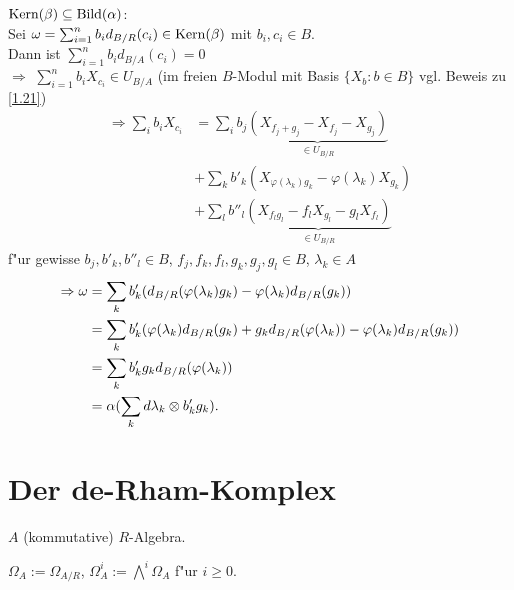 \documentclass[a4paper, 10pt]{report}
\begin{document}
\begin{Prop}
\begin{enumerate}
\begin{Bew}
\glqq$\mathrm{Kern}(\beta) \subseteq \mathrm{Bild}(\alpha)$\grqq:\\
Sei $\omega = \sum_{i=1}^n{b_i} d_{B/R}(c_i) \in \mathrm{Kern}(\beta)$ mit $b_i,c_i \in B$.\\
Dann ist $\sum_{i=1}^n{b_i d_{B/A}}(c_i) = 0$\\
$\Rightarrow$ $\sum_{i=1}^n{b_i X_{c_i}} \in U_{B/A}$ (im freien $B$-Modul mit Basis $\{ X_b : b \in B \}$ vgl. Beweis zu \ref{1.21})
\begin{align*}
\Rightarrow\sum_i b_i X_{c_i} &= \sum_i b_j \underbrace{(X_{f_j + g_j} - X_{f_j} - X_{g_j})}_{\in U_{B/R}} \\
&+ \sum_k b'_k (X_{\varphi(\lambda_k) g_k} - \varphi(\lambda_k) X_{g_k}) \\
&+ \sum_l b''_l \underbrace{(X_{f_l g_l} - f_l X_{g_l} - g_l X_{f_l})}_{\in
U_{B/R}}
\end{align*}
f"ur gewisse $b_j, b'_k, b''_l \in B$, $f_j,f_k,f_l,g_k,g_j,g_l \in B$,
$\lambda_k \in A$
\begin{align*}
\Rightarrow \omega &= \sum_k b'_k (d_{B/R}(\varphi(\lambda_k) g_k) - \varphi(\lambda_k) d_{B/R}(g_k)) \\
&= \sum_k b'_k (\varphi(\lambda_k) d_{B/R}(g_k) + g_k 
d_{B/R}(\varphi(\lambda_k)) - \varphi(\lambda_k) d_{B/R}(g_k)) \\
&= \sum_k b'_k g_k d_{B/R}(\varphi(\lambda_k))\\
&= \alpha(\sum_k d\lambda_k \ten b'_k g_k).
\end{align*}
\end{Bew}
\end{enumerate}
\end{Prop}

\section{Der de-Rham-Komplex}

$A$ (kommutative) $R$-Algebra.

$\Omega_A := \Omega_{A/R}$, $\Omega^i_A := \bigwedge\nolimits^i\Omega_A$ f"ur $i \geq 0$.
\end{document}
